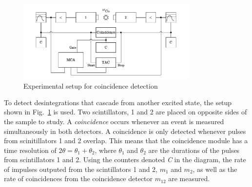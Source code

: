 \begin{figure}[h]
    \centering
    \includegraphics[width=0.8\textwidth]{figures/coincidence_schematic.pdf}
    \caption{Experimental setup for coincidence detection \cite{notice_VI}}
    \label{fig:setup_coincidences}
\end{figure}
To detect desintegrations that cascade from another excited state, the setup shown in \hbox{Fig. \ref{fig:setup_coincidences}} is used. 
Two scintillators, 1 and 2 are placed on opposite sides of the sample to study.
A \emph{coincidence} occurs whenever an event is measured simultaneously in both detectors. A coincidence is only detected whenever pulses from scinitillators 1 and 2 overlap. This means that the coincidence module has a time resolution of \(2 \theta = \theta_1 + \theta_2\), where \(\theta_1\) and \(\theta_2\) are the durations of the pulses from scintillators 1 and 2.
Using the counters denoted \emph{C} in the diagram, the rate of impulses outputed from the scintillators 1 and 2, \(m_1\) and \(m_2\), as well as the rate of coincidences from the coincidence detector \(m_{12}\) are measured. %

